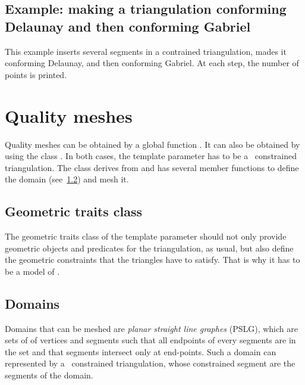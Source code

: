 \subsection{Example: making a triangulation conforming Delaunay and then
  conforming Gabriel}
\label{sec:Mesh_2_example_making_conforming}

This example inserts several segments in a contrained triangulation, mades
it conforming Delaunay, and then conforming Gabriel. At each step, the
number of points is printed.


\section{Quality meshes}
\label{sec:Mesh_2_meshes}

Quality meshes can be obtained by a global function . It can
 also be obtained by using the class . In both
 cases, the template parameter  has to be a \cgal\ constrained
 triangulation. The class  derives from 
 and has several member functions to define the domain
 (see~\ref{sec:Mesh_2_domains}) and mesh it.

\subsection{Geometric traits class}
\label{sec:Mesh_2_geomtraits}

The geometric traits class of the template parameter  should not
only provide geometric objects and predicates for the triangulation, as
usual, but also define the geometric constraints that the triangles have to
satisfy. That is why it has to be a model of
.

\subsection{Domains}
\label{sec:Mesh_2_domains}

Domains that can be meshed are \emph{planar straight line graphes}
(PSLG), which are sets of of vertices and segments such that all
endpoints of every segments are in the set and that segments intersect
only at end-points. Such a domain can represented by a \cgal\
constrained triangulation, whose constrained segment are the segments
of the domain.

